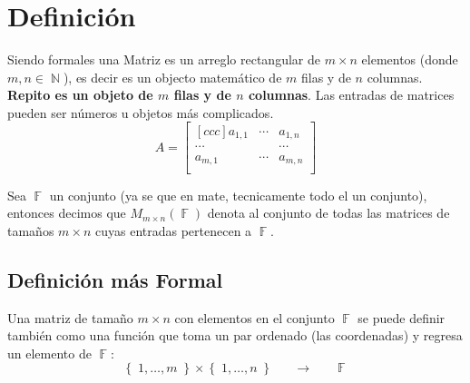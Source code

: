 \documentclass[12pt, fleqn]{report}                             %
\DeclareMathOperator \Space     {\quad}                         %
\theoremstyle{break}                                            %
\newcommand \lLongTo {\longrightarrow}                          %
\DeclareMathOperator \Naturals     {\mathbb{N}}                 %
\DeclareMathOperator \GenericField {\mathbb{F}}                 %
\newcommand{\Set}[1]            {\left\{ \; #1 \; \right\}}     %
\begin{document}
        \section{Definición}

            Siendo formales una Matriz es un arreglo rectangular de $m \times n$ elementos 
            (donde $m,n \in \Naturals$), es decir es un objecto matemático de $m$ filas y
            de $n$ columnas. \textbf{Repito es un objeto de $m$ filas y de $n$ columnas}.
            Las entradas de matrices pueden ser números u objetos más complicados.
            \begin{equation*}
                A = 
                \begin{bmatrix}[ccc]
                    a _{1, 1}   & \cdots & a_{1,n}   \\
                    \cdots      &        & \cdots    \\
                    a _{m, 1}   & \cdots & a_{m,n}   \\
                \end{bmatrix}
            \end{equation*}
            
            Sea $\GenericField$ un conjunto (ya se que en mate, tecnicamente todo el un conjunto),
            entonces decimos que $M_{m \times n}(\GenericField)$ denota al conjunto de todas las
            matrices de tamaños $m \times n$ cuyas entradas pertenecen a $\GenericField$.


            \vspace{2em}
            \subsection*{Definición más Formal}
                Una matriz de tamaño $m \times n$ con elementos en el conjunto $\GenericField$ se puede
                definir también como una función que toma un par ordenado (las coordenadas) y regresa
                un elemento de $\GenericField$: 
                \begin{equation*}
                    \Set{1, \dots, m} \times \Set{1, \dots , n}
                        \Space \lLongTo \Space
                    \GenericField
                \end{equation*}


            \clearpage
\end{document}
